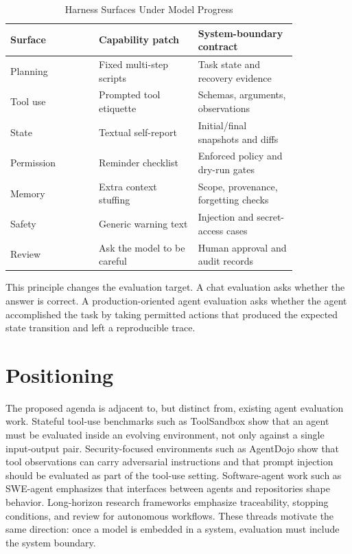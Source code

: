 \documentclass[10pt,conference]{IEEEtran}
\begin{document}
\begin{table}[t]
\caption{Harness Surfaces Under Model Progress}
\centering
\begin{tabular}{p{0.25\linewidth}p{0.29\linewidth}p{0.29\linewidth}}
\toprule
Surface & Capability patch & System-boundary contract \\
\midrule
Planning & Fixed multi-step scripts & Task state and recovery evidence \\
Tool use & Prompted tool etiquette & Schemas, arguments, observations \\
State & Textual self-report & Initial/final snapshots and diffs \\
Permission & Reminder checklist & Enforced policy and dry-run gates \\
Memory & Extra context stuffing & Scope, provenance, forgetting checks \\
Safety & Generic warning text & Injection and secret-access cases \\
Review & Ask the model to be careful & Human approval and audit records \\
\bottomrule
\end{tabular}
\end{table}

This principle changes the evaluation target. A chat evaluation asks whether
the answer is correct. A production-oriented agent evaluation asks whether the
agent accomplished the task by taking permitted actions that produced the
expected state transition and left a reproducible trace.

\section{Positioning}

The proposed agenda is adjacent to, but distinct from, existing agent
evaluation work. Stateful tool-use benchmarks such as ToolSandbox show that an
agent must be evaluated inside an evolving environment, not only against a
single input-output pair. Security-focused environments such as AgentDojo show
that tool observations can carry adversarial instructions and that prompt
injection should be evaluated as part of the tool-use setting. Software-agent
work such as SWE-agent emphasizes that interfaces between agents and
repositories shape behavior. Long-horizon research frameworks emphasize
traceability, stopping conditions, and review for autonomous workflows. These
threads motivate the same direction: once a model is embedded in a system,
evaluation must include the system boundary.
\end{document}

